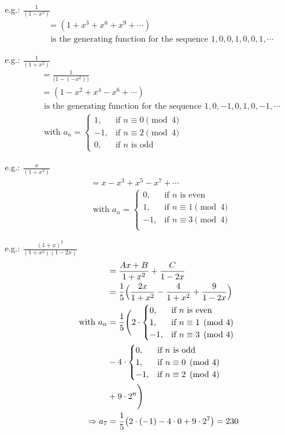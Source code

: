 \documentclass[a4paper]{article}
\begin{document}
\color{red}e.g.: \color{black} $\frac{1}{(1-x^3)}$
\begin{align*}
    &=(1+x^3+x^6+x^9+\cdots)\\
    &\text{ is the generating function for the sequence } 1,0,0,1,0,0,1,\cdots
\end{align*}

\color{red}e.g.: \color{black} $\frac{1}{(1+x^2)}$
\begin{align*}
    &=\frac{1}{\bigl(1-(-x^2)\bigr)}\\
    &=(1-x^2+x^4-x^6+\cdots)\\
    &\text{ is the generating function for the sequence } 1,0,-1,0, 1,0,-1,\cdots\\
    &\text{ with } a_n= 
        \begin{cases}
        1,  & \text{if $n\equiv 0\pmod  4$} \\
        -1,  & \text{if $n\equiv 2\pmod  4$} \\
        0, & \text{if $n$ is odd}
        \end{cases}
\end{align*}

\color{red}e.g.: \color{black} $\frac{x}{(1+x^2)}$
\begin{align*}
    &=x-x^3+x^5-x^7+\cdots\\
    &\text{ with } a_n= 
        \begin{cases}
        0,  & \text{if $n$ is even} \\
        1,  & \text{if $n\equiv 1\pmod  4$} \\
        -1, & \text{if $n\equiv 3\pmod  4$} \\
        \end{cases}
\end{align*}

\color{red}e.g.: \color{black} $\frac{(1+x)^2}{(1+x^2)(1-2x)}$
\begin{align*}
    &=\frac{Ax+B}{1+x^2}+\frac{C}{1-2x}\\
    &=\frac{1}{5}\Bigl(\frac{2x}{1+x^2}-\frac{4}{1+x^2}+\frac{9}{1-2x}\Bigr)\\
    \text{ with } a_n&=\frac{1}{5}\Biggl(2\cdot
        \begin{cases}
        0,  & \text{if $n$ is even} \\
        1,  & \text{if $n\equiv 1\pmod  4$} \\
        -1, & \text{if $n\equiv 3\pmod  4$} \\
        \end{cases}\\
    &
        -4\cdot
        \begin{cases}
        0,  & \text{if $n$ is odd} \\
        1,  & \text{if $n\equiv 0\pmod  4$} \\
        -1, & \text{if $n\equiv 2\pmod  4$} \\
        \end{cases}\\
    & 
        +9\cdot 2^n 
        \Biggr)\\
    \Rightarrow a_7&=\frac{1}{5}\bigl(2\cdot(-1)-4\cdot 0 + 9\cdot 2^7\bigr)=230
\end{align*}
\end{document}
